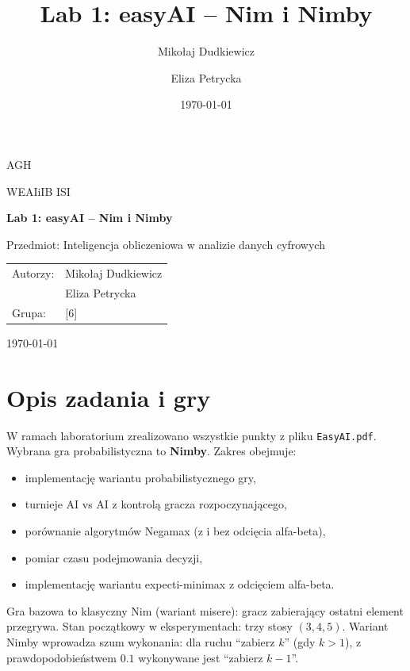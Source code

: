 \documentclass[11pt,a4paper]{article}
\title{Lab 1: easyAI -- Nim i Nimby}
\author{Mikołaj Dudkiewicz \and Eliza Petrycka}
\date{\today}
\begin{document}
\hypersetup{pageanchor=false}
\begin{titlepage}
    \centering
    {\large AGH\par}
    \vspace{0.4cm}
    {\large WEAIiIB ISI\par}
    \vspace{2.5cm}
    {\LARGE \textbf{Lab 1: easyAI -- Nim i Nimby}\par}
    \vspace{1.2cm}
    {\large Przedmiot: Inteligencja obliczeniowa w analizie danych cyfrowych\par}
    \vspace{1.8cm}
    \begin{tabular}{>{\raggedright\arraybackslash}p{} p{}}
        Autorzy: & Mikołaj Dudkiewicz \\
                 & Eliza Petrycka \\
        Grupa:   & [6] \\
    \end{tabular}
    \vfill
    {\large \today\par}
\end{titlepage}

\tableofcontents
\newpage
\hypersetup{pageanchor=true}

\section{Opis zadania i gry}
W ramach laboratorium zrealizowano wszystkie punkty z pliku \texttt{EasyAI.pdf}.
Wybrana gra probabilistyczna to \textbf{Nimby}. Zakres obejmuje:
\begin{itemize}
    \item implementację wariantu probabilistycznego gry,
    \item turnieje AI vs AI z kontrolą gracza rozpoczynającego,
    \item porównanie algorytmów Negamax (z i bez odcięcia alfa-beta),
    \item pomiar czasu podejmowania decyzji,
    \item implementację wariantu expecti-minimax z odcięciem alfa-beta.
\end{itemize}

Gra bazowa to klasyczny Nim (wariant misere): gracz zabierający ostatni element przegrywa.
Stan początkowy w eksperymentach: trzy stosy \((3,4,5)\). Wariant Nimby wprowadza
szum wykonania: dla ruchu ``zabierz $k$'' (gdy $k>1$), z prawdopodobieństwem $0.1$
wykonywane jest ``zabierz $k-1$''.
\end{document}
